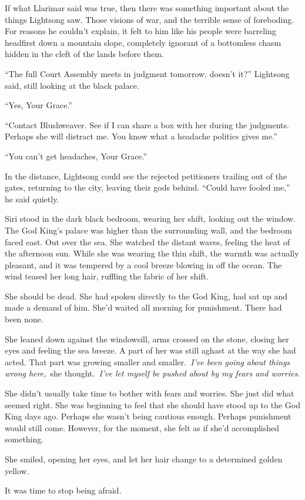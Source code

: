 If what Llarimar said was true, then there was something important about the things Lightsong saw. Those visions of war, and the terrible sense of foreboding. For reasons he couldn’t explain, it felt to him like his people were barreling headfirst down a mountain slope, completely ignorant of a bottomless chasm hidden in the cleft of the lands before them.

“The full Court Assembly meets in judgment tomorrow, doesn’t it?” Lightsong said, still looking at the black palace.

“Yes, Your Grace.”

“Contact Blushweaver. See if I can share a box with her during the judgments. Perhaps she will distract me. You know what a headache politics gives me.”

“You can’t get headaches, Your Grace.”

In the distance, Lightsong could see the rejected petitioners trailing out of the gates, returning to the city, leaving their gods behind. “Could have fooled me,” he said quietly.

\orn

Siri stood in the dark black bedroom, wearing her shift, looking out the window. The God King’s palace was higher than the surrounding wall, and the bedroom faced east. Out over the sea. She watched the distant waves, feeling the heat of the afternoon sun. While she was wearing the thin shift, the warmth was actually pleasant, and it was tempered by a cool breeze blowing in off the ocean. The wind teased her long hair, ruffling the fabric of her shift.

She should be dead. She had spoken directly to the God King, had sat up and made a demand of him. She’d waited all morning for punishment. There had been none.

She leaned down against the windowsill, arms crossed on the stone, closing her eyes and feeling the sea breeze. A part of her was still aghast at the way she had acted. That part was growing smaller and smaller.~\textit{I’ve been going about things wrong here,}~she thought.~\textit{I’ve let myself be pushed about by my fears and worries.}

She didn’t usually take time to bother with fears and worries. She just did what seemed right. She was beginning to feel that she should have stood up to the God King days ago. Perhaps she wasn’t being cautious enough. Perhaps punishment would still come. However, for the moment, she felt as if she’d accomplished something.

She smiled, opening her eyes, and let her hair change to a determined golden yellow.

It was time to stop being afraid.

